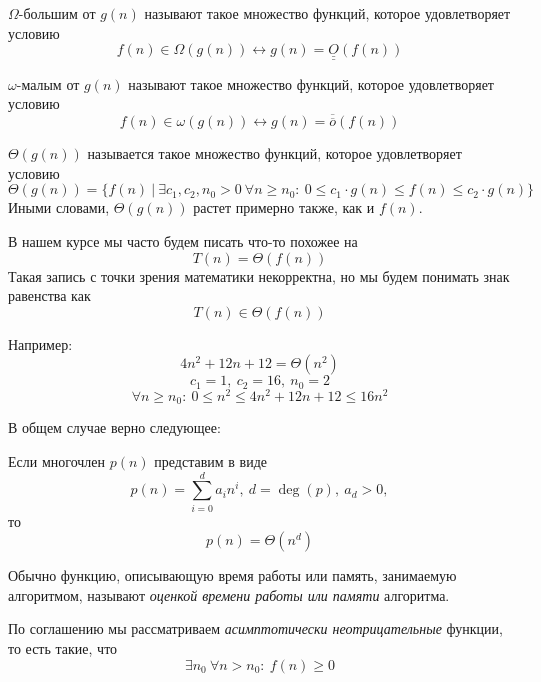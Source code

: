 \documentclass[../book.tex]{subfiles}
\begin{document}
	\begin{definition}
		$\Omega$-большим от $g(n)$ называют такое множество функций, которое удовлетворяет условию
		\[
		f(n) \in \Omega(g(n)) \leftrightarrow g(n) = \underline{\underline{O}}(f(n))
		\]
	\end{definition}
	
	\begin{definition}
		$\omega$-малым от $g(n)$ называют такое множество функций, которое удовлетворяет условию
		\[
		f(n) \in \omega(g(n)) \leftrightarrow g(n) = \overline{\overline{o}}(f(n))
		\]
	\end{definition}
		

	
	\begin{definition}
		$\Theta(g(n))$ называется такое множество функций, которое удовлетворяет условию
		\[\Theta(g(n)) = 
		\{
		f(n) \ | \ 
		\exists c_1, c_2,n_0 > 0 \ \forall n\geqslant n_0: \
		0\leqslant c_1\cdot g(n)\leqslant f(n) \leqslant c_2 \cdot g(n)
		\}
		\]
		Иными словами, $\Theta(g(n))$ растет примерно также, как и $f(n)$.
	\end{definition}

	
	В нашем курсе мы часто будем писать что-то похожее на
	\[
	T(n) = \Theta(f(n))
	\]
	Такая запись с точки зрения математики некорректна, но мы будем понимать знак равенства как
	\[
	T(n) \in \Theta(f(n))
	\]
	
	Например:
	\[
	4n^2+12n+12 = \Theta(n^2)
	\]
	\[
	c_1 = 1, \ c_2 = 16, \	n_0 = 2
	\]
	\[
	\forall n \geqslant n_0: \ 0 \leqslant n^2 \leqslant 4n^2+12n+12 \leqslant 16n^2
	\]
	
	В общем случае верно следующее:
	\begin{lemma}
		Если многочлен $p(n)$ представим в виде
		\[
		p(n) = \sum_{i = 0}^{d}	a_in^i, \ d = \deg(p), \ a_d > 0, 
		\]
		то 
		\[
		p(n) = \Theta(n^d)
		\]
	\end{lemma}
	
	\begin{remark}
		Обычно функцию, описывающую время работы или память, занимаемую алгоритмом, называют \textit{оценкой времени работы или памяти} алгоритма.
	\end{remark}
	
	\begin{remark}
		По соглашению мы рассматриваем \textit{асимптотически неотрицательные} функции, то есть такие, что 
		\[
		\exists n_0 \ \forall n > n_0: \ f(n) \geqslant 0
		\]
	\end{remark}
	
\end{document}
